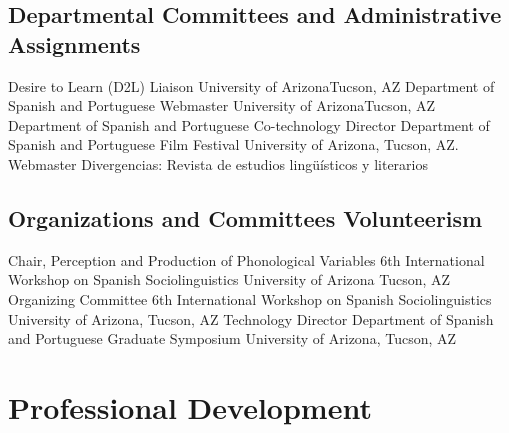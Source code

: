 \documentclass[12pt,letterpaper]{moderncv}
\begin{document}
\subsection{Departmental Committees and Administrative Assignments}
        {Desire to Learn (D2L) Liaison}
        {University of Arizona}{Tucson, AZ}
        {}
        {Department of Spanish and Portuguese}
        {}
        {}
        {Webmaster}
        {University of Arizona}{Tucson, AZ}
        {}
        {Department of Spanish and Portuguese}
        {}
        {}
        {Co-technology Director}
        {Department of Spanish and Portuguese Film Festival}
        {}
        {}
        {University of Arizona, Tucson, AZ.}
        {Webmaster}
        {Divergencias: Revista de estudios ling\"u\'isticos y literarios}
        {}
        {}
        {}

\subsection{Organizations and Committees Volunteerism}
        {Chair, Perception and Production of Phonological Variables}
        {6th International Workshop on Spanish Sociolinguistics}
        {University of Arizona}
        {Tucson, AZ}
        {}
        {Organizing Committee}
        {6th International Workshop on Spanish Sociolinguistics}
        {}
        {}
        {University of Arizona, Tucson, AZ}
        {Technology Director}
        {Department of Spanish and Portuguese Graduate Symposium}
        {}
        {}
        {University of Arizona, Tucson, AZ}






\section{Professional Development}
\end{document}
